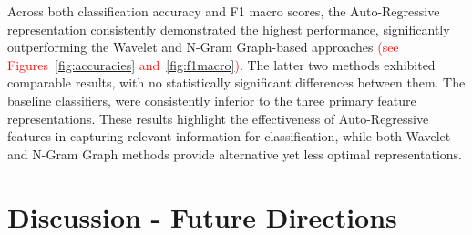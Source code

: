 \documentclass{article}
\begin{document}
Across both classification accuracy and F1 macro scores, the Auto-Regressive representation consistently demonstrated the highest performance, significantly outperforming the Wavelet and N-Gram Graph-based approaches \textcolor{red}{(see Figures~\ref{fig:accuracies} and~\ref{fig:f1macro})}. The latter two methods exhibited comparable results, with no statistically significant differences between them. The baseline classifiers, were consistently inferior to the three primary feature representations. These results highlight the effectiveness of Auto-Regressive features in capturing relevant information for classification, while both Wavelet and N-Gram Graph methods provide alternative yet less optimal representations.

\section{Discussion - Future Directions}
\end{document}
